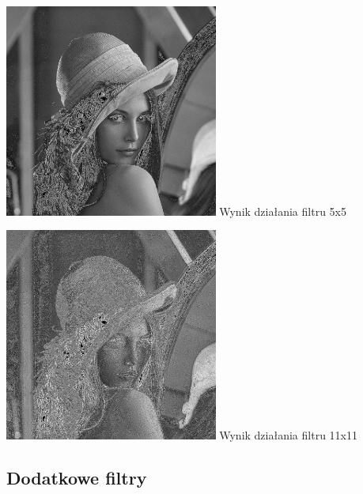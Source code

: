 \documentclass[a4paper,12pt,openany]{report}
\begin{document}
\begin{center}
\includegraphics[width=7cm]{resources/modified/lena/lena_sharpen_5x5.jpg}
\linebreak
\tiny{Wynik działania filtru 5x5}
\end{center}

\begin{center}
\includegraphics[width=7cm]{resources/modified/lena/lena_sharpen_11x11.jpg}
\linebreak
\tiny{Wynik działania filtru 11x11}
\end{center}

\pagebreak
\subsection{Dodatkowe filtry}
\end{document}
